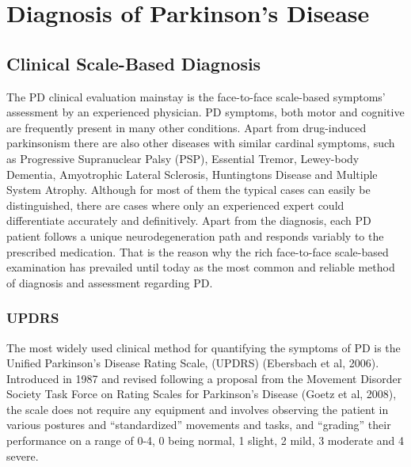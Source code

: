 \chapter{Diagnosis of Parkinson's Disease}
\label{ch:diagnosis}
\pagestyle{fancy}
\fancyhf{}
\fancyhead[OC]{\leftmark}
\fancyhead[EC]{\rightmark}
\cfoot{\thepage}


\section{Clinical Scale-Based Diagnosis}
\label{sec:scaleBased}
The \gls{PD} clinical evaluation mainstay is the face-to-face scale-based symptoms' assessment by an experienced physician. \gls{PD} symptoms, both motor and cognitive are frequently present in many other conditions. Apart from drug-induced parkinsonism there are also other diseases with similar cardinal symptoms, such as Progressive Supranuclear Palsy (PSP), Essential Tremor, Lewey-body Dementia, Amyotrophic Lateral Sclerosis, Huntingtons Disease and Multiple System Atrophy. Although for most of them the typical cases can easily be distinguished, there are cases where only an experienced expert could differentiate accurately and definitively. Apart from the diagnosis, each \gls{PD} patient follows a unique neurodegeneration path and responds variably to the prescribed medication. That is the reason why the rich face-to-face scale-based examination has prevailed until today as the most common and reliable method of diagnosis and assessment regarding \gls{PD}. 


\subsection{UPDRS}
\label{subsec:updrs}
The most widely used clinical method for quantifying the symptoms of \gls{PD} is the Unified Parkinson's Disease Rating Scale, (\gls{UPDRS}) (Ebersbach et al, 2006). Introduced in 1987 and revised following a proposal from the Movement Disorder Society Task Force on Rating Scales for Parkinson's Disease (Goetz et al, 2008), the scale does not require any equipment and involves observing the patient in various postures and ``standardized'' movements and tasks, and ``grading'' their performance on a range of 0-4, 0 being normal, 1 slight, 2 mild, 3 moderate and 4 severe.

